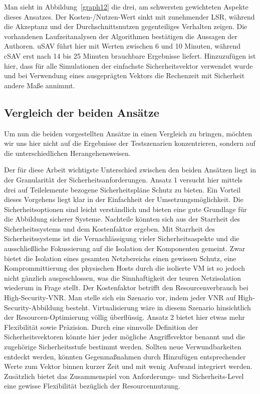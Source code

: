 \documentclass{lni}
\begin{document}
Man sieht in Abbildung~\ref{graph12} die drei, am schwersten gewichteten Aspekte dieses Ansatzes. Der Kosten-/Nutzen-Wert sinkt mit zunehmender LSR, während die Akzeptanz und der Durchschnittsnutzen gegenteiliges Verhalten zeigen. Die vorhandenen Laufzeitanalysen der Algorithmen bestätigen die Aussagen der Authoren. uSAV führt hier mit Werten zwischen 6 und 10 Minuten, während cSAV erst nach 14 bis 25 Minuten brauchbare Ergebnisse liefert. Hinzuzufügen ist hier, dass für alle Simulationen der einfachste Sicherheitsvektor verwendet wurde und bei Verwendung eines ausgeprägten Vektors die Rechenzeit mit Sicherheit andere Maße annimmt.


\subsection{Vergleich der beiden Ansätze}
\label{subsec:svne_vergleich}

Um nun die beiden vorgestellten Ansätze in einen Vergleich zu bringen, möchten wir uns hier nicht auf die Ergebnisse der Testszenarien konzentrieren, sondern auf die unterschiedlichen Herangehensweisen.

Der für diese Arbeit wichtigste Unterschied zwischen den beiden Ansätzen liegt in der Granularität der Sicherheitsanforderungen. Ansatz 1 versucht hier mittels drei auf Teilelemente bezogene Sicherheitspläne Schutz zu bieten. Ein Vorteil dieses Vorgehens liegt klar in der Einfachheit der Umsetzungsmöglichkeit. Die Sicherheitsoptionen sind leicht verständlich und bieten eine gute Grundlage für die Abbildung sicherer Systeme. Nachteile könnten sich aus der Starrheit des Sicherheitssystems und dem Kostenfaktor ergeben. Mit Starrheit des Sicherheitssystems ist die Vernachlässigung vieler Sicherheitsaspekte und die ausschließliche Fokussierung auf die Isolation der Komponenten gemeint. Zwar bietet die Isolation eines gesamten Netzbereichs einen gewissen Schutz, eine Komprommittierung des physischen Hosts durch die isolierte VM ist so jedoch nicht gänzlich ausgeschlossen, was die Sinnhaftigkeit der teuren Netzisolation wiederum in Frage stellt. Der Kostenfaktor betrifft den Resourcenverbrauch bei High-Security-VNR. Man stelle sich ein Szenario vor, indem jeder VNR auf High-Security-Abbildung besteht. Virtualisierung wäre in diesem Szenario hinsichtlich der Resourcen-Optimierung völlig überflüssig. Ansatz 2 bietet hier etwas mehr Flexibilität sowie Präzision. Durch eine sinnvolle Definition der Sicherheitsvektoren könnte hier jeder mögliche Angriffsvektor benannt und die zugehörige Sicherheitsstufe bestimmt werden. Sollten neue Verwundbarkeiten entdeckt werden, könnten Gegenmaßnahmen durch Hinzufügen entsprechender Werte zum Vektor binnen kurzer Zeit und mit wenig Aufwand integriert werden. Zusätzlich bietet das Zusammenspiel von Anforderungs- und Sicherheits-Level eine gewisse Flexibilität bezüglich der Resourcennutzung. 
\end{document}
